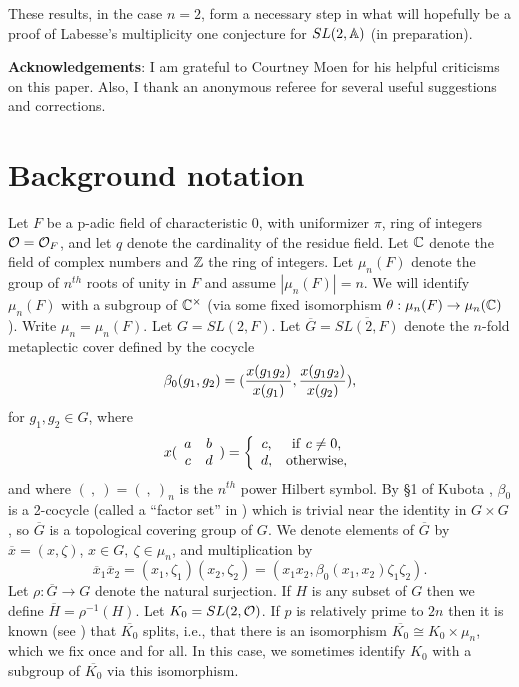 \documentclass[twocolumn,10pt]{article}
\begin{document}
These results, in the case $n=2$, form a 
necessary step in what will hopefully be a
proof of Labesse's multiplicity one conjecture for
$SL(2,{\Bbb{A}})$ (in preparation). 

{\bf Acknowledgements}:
 I am grateful to Courtney Moen for his helpful criticisms
on this paper. Also, I thank an anonymous referee for
several useful suggestions and corrections.

\section{Background notation}

Let $F$ be a p-adic field of characteristic 0, 
with uniformizer $\pi$, ring of integers ${\cal O}={\cal O}_F$, and let 
$q$ denote the cardinality of the residue field.
Let ${\Bbb{C}}$ denote the field of complex numbers and
${\Bbb{Z}}$ the ring of integers.
Let $\mu_n(F)$ denote the group of $n^{th}$ roots of unity
in $F$ and assume $|\mu_n(F)|=n$. We 
will identify $\mu_n(F)$ with a subgroup 
of ${\Bbb{C}}^\times$ (via some fixed isomorphism 
$\theta:\mu_n(F)\rightarrow \mu_n({\Bbb{C}})$).
Write $\mu_n=\mu_n(F)$.
Let $G=SL(2,F)$. Let $\overline{G}=\overline{SL(2,F)}$ 
denote the $n$-fold metaplectic cover defined by the cocycle
\begin{equation}
\beta_0(g_1,g_2)=({x(g_1g_2)\over x(g_1)},{x(g_1g_2)\over x(g_2)}),
\label{eqn:1}
\end{equation}
for $g_1,g_2\in G$, where
\[
x(
\begin{array}{cc}
a & b\\
c & d
\end{array}
)=
\left\{
\begin{array}{cc}
c,& {\rm if}\ c\not= 0,\\
d,& {\rm otherwise},
\end{array}
\right.
\]
and where $(\ ,\ )=(\ ,\ )_n$ is the $n^{th}$ power Hilbert symbol. 
By \S 1 of Kubota \cite{K}, $\beta_0$ is a 2-cocycle 
(called a ``factor set'' in \cite{K}) which is trivial
near the identity in $G\times G$, so $\overline{G}$ is a 
topological covering group of $G$. We denote
elements of $\overline{G}$ by $\overline{x}=(x,\zeta)$,
$x\in G,\ \zeta\in \mu_n$, and multiplication by
\[
\overline{x}_1\overline{x}_2=(x_1,\zeta_1)(x_2,\zeta_2)
=(x_1x_2,\beta_0(x_1,x_2)\zeta_1\zeta_2).
\]
Let $\rho:\overline{G}\rightarrow G$ denote
the natural surjection. If $H$ is any subset
of $G$ then we define $\overline{H}=\rho^{-1}(H)$.
Let $K_0=SL(2,{\cal O})$. If $p$ is
relatively prime to $2n$ then it is known
(see \cite{K}) that $\overline{K_0}$ splits,
i.e., that there is an isomorphism
$\overline{K_0}\cong K_0\times \mu_n$, which we
fix once and for all. In this case, we sometimes
identify $K_0$ with a subgroup of $\overline{K_0}$
via this isomorphism.
\end{document}
